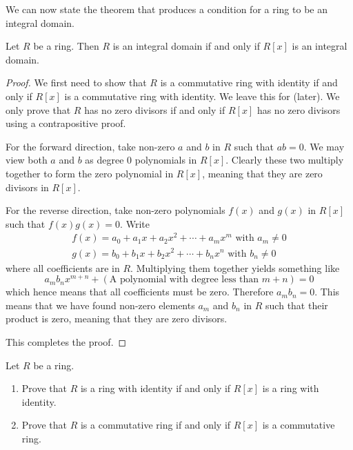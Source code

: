 We can now state the theorem that produces a condition for a ring to be an integral domain.
\begin{theorem}\label{thrm-integral-domain-iff-polynomial-ring-is-also}
    Let $R$ be a ring. Then $R$ is an integral domain if and only if $R[x]$ is an integral domain.
\end{theorem}
\begin{proof}
    We first need to show that $R$ is a commutative ring with identity if and only if $R[x]$ is a commutative ring with identity. We leave this for  (later). We only prove that $R$ has no zero divisors if and only if $R[x]$ has no zero divisors using a contrapositive proof.

    For the forward direction, take non-zero $a$ and $b$ in $R$ such that $ab = 0$. We may view both $a$ and $b$ as degree 0 polynomials in $R[x]$. Clearly these two multiply together to form the zero polynomial in $R[x]$, meaning that they are zero divisors in $R[x]$.

    For the reverse direction, take non-zero polynomials $f(x)$ and $g(x)$ in $R[x]$ such that $f(x)g(x) = 0$. Write
    \begin{align*}
        f(x) = a_0+a_1x+a_2x^2+\cdots+a_mx^m \text{ with } a_m \neq 0\\
        g(x) = b_0+b_1x+b_2x^2+\cdots+b_nx^n \text{ with } b_n \neq 0
    \end{align*}
    where all coefficients are in $R$. Multiplying them together yields something like
    \[
        a_mb_nx^{m+n} + (\text{A polynomial with degree less than }m+n) = 0
    \]
    which hence means that all coefficients must be zero. Therefore $a_mb_n = 0$. This means that we have found non-zero elements $a_m$ and $b_n$ in $R$ such that their product is zero, meaning that they are zero divisors.

    This completes the proof.
\end{proof}
\begin{exercise}\label{exercise-commutative-ring-with-identity-iff-polynomial-ring-is-also}
    Let $R$ be a ring.
    \begin{enumerate}[label=(\alph*)]
        \item Prove that $R$ is a ring with identity if and only if $R[x]$ is a ring with identity.
        \item Prove that $R$ is a commutative ring if and only if $R[x]$ is a commutative ring.
    \end{enumerate}
\end{exercise}

